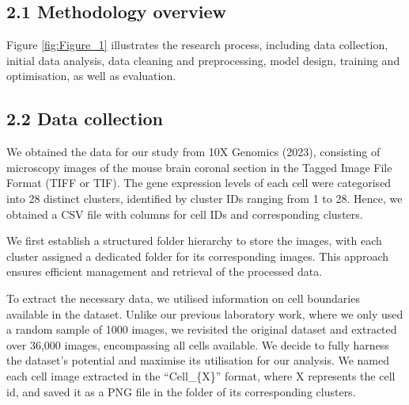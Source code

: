 \documentclass[letterpaper,9pt,twocolumn,twoside,]{pinp}
\begin{document}
\hypertarget{methodology-overview}{%
\subsection{2.1 Methodology overview}\label{methodology-overview}}

Figure \ref{fig:Figure_1} illustrates the research process, including
data collection, initial data analysis, data cleaning and preprocessing,
model design, training and optimisation, as well as evaluation.

\hypertarget{data-collection}{%
\subsection{2.2 Data collection}\label{data-collection}}

We obtained the data for our study from 10X Genomics (2023), consisting
of microscopy images of the mouse brain coronal section in the Tagged
Image File Format (TIFF or TIF). The gene expression levels of each cell
were categorised into 28 distinct clusters, identified by cluster IDs
ranging from 1 to 28. Hence, we obtained a CSV file with columns for
cell IDs and corresponding clusters.

We first establish a structured folder hierarchy to store the images,
with each cluster assigned a dedicated folder for its corresponding
images. This approach ensures efficient management and retrieval of the
processed data.

To extract the necessary data, we utilised information on cell
boundaries available in the dataset. Unlike our previous laboratory
work, where we only used a random sample of 1000 images, we revisited
the original dataset and extracted over 36,000 images, encompassing all
cells available. We decide to fully harness the dataset's potential and
maximise its utilisation for our analysis. We named each cell image
extracted in the ``Cell\_\{X\}'' format, where X represents the cell id,
and saved it as a PNG file in the folder of its corresponding clusters.

\newpage
\end{document}
